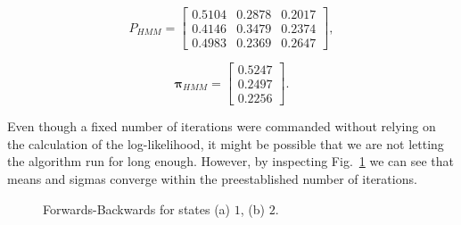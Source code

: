 \documentclass[letterpaper, 10 pt, conference]{ieeeconf}  %
\begin{document}
\begin{equation*}
 P_{HMM} = \begin{bmatrix}
          0.5104 & 0.2878 & 0.2017\\
          0.4146 & 0.3479 & 0.2374\\
          0.4983 & 0.2369 & 0.2647
        \end{bmatrix},
\end{equation*}  

\begin{equation*}
 \bm{\pi}_{HMM} = \begin{bmatrix} 0.5247\\ 0.2497\\ 0.2256\end{bmatrix}.
\end{equation*}  

Even though a fixed number of iterations were commanded without relying on the calculation of the log-likelihood, it might be possible
that we are not letting the algorithm run for long enough. However, by inspecting Fig.~\ref{fig:EvolutionParameters} we can see that means 
and sigmas converge within the preestablished number of iterations.

\begin{figure}[ht!]
 \begin{center}
         \caption{Forwards-Backwards for states (a) $1$, (b) $2$. }
 \label{fig:EvolutionParameters}
 \end{center}
\end{figure}
\end{document}
